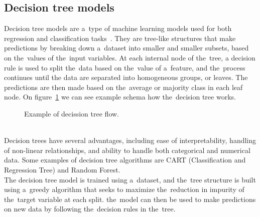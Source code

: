 \subsection{Decision tree models}\label{sec:trees}
Decision tree models are a~type of machine learning models used for both regression and classification
tasks~\cite{Kotsiantis}. They are tree-like structures that make predictions by breaking down a~dataset into
smaller and smaller subsets, based on the~values of the~input variables. At each internal node of the~tree,
a decision rule is used to split the~data based on the~value of a~feature, and the~process continues until the
data are separated into homogeneous groups, or leaves.
The predictions are then made based on the~average or majority class in each leaf node. On figure~\ref{fig:example_tree} we can see example schema how the~decision tree works.\\
\begin{figure}
    \centering
    \caption{Example of decission tree flow.}\label{fig:example_tree}
\end{figure}
\\
Decision trees have several advantages, including ease of interpretability, handling of non-linear relationships,
and ability to handle both categorical and numerical data. Some examples of decision tree algorithms are CART
(Classification and Regression Tree) and Random Forest.
\\
The decision tree model is trained using a~dataset, and the~tree structure is built using a~greedy algorithm
that seeks to maximize the~reduction in impurity of the~target variable at each split. the~model can then be used
to make predictions on new data by following the~decision rules in the~tree.

